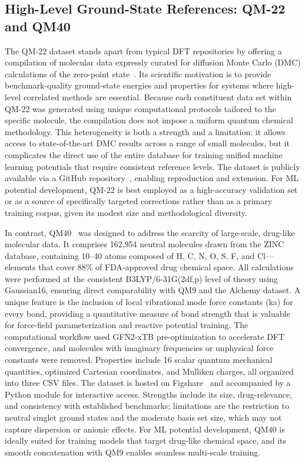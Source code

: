 \documentclass[12pt]{article}
\begin{document}
\subsection{High-Level Ground-State References: QM-22 and QM40}

The QM-22 dataset stands apart from typical DFT repositories by offering a compilation of molecular data expressly curated for diffusion Monte Carlo (DMC) calculations of the zero-point state~\cite{ds41-40}. Its scientific motivation is to provide benchmark-quality ground-state energies and properties for systems where high-level correlated methods are essential. Because each constituent data set within QM-22 was generated using unique computational protocols tailored to the specific molecule, the compilation does not impose a uniform quantum chemical methodology. This heterogeneity is both a strength and a limitation: it allows access to state-of-the-art DMC results across a range of small molecules, but it complicates the direct use of the entire database for training unified machine learning potentials that require consistent reference levels. The dataset is publicly available via a GitHub repository~\cite{ds41-188}, enabling reproduction and extension. For ML potential development, QM-22 is best employed as a high-accuracy validation set or as a source of specifically targeted corrections rather than as a primary training corpus, given its modest size and methodological diversity.

In contrast, QM40~\cite{ds48-1} was designed to address the scarcity of large-scale, drug-like molecular data. It comprises 162,954 neutral molecules drawn from the ZINC database, containing 10–40 atoms composed of H, C, N, O, S, F, and Cl—elements that cover 88\% of FDA-approved drug chemical space. All calculations were performed at the consistent B3LYP/6-31G(2df,p) level of theory using Gaussian16, ensuring direct comparability with QM9 and the Alchemy dataset. A unique feature is the inclusion of local vibrational mode force constants (ka) for every bond, providing a quantitative measure of bond strength that is valuable for force-field parameterization and reactive potential training. The computational workflow used GFN2-xTB pre-optimization to accelerate DFT convergence, and molecules with imaginary frequencies or unphysical force constants were removed. Properties include 16 scalar quantum mechanical quantities, optimized Cartesian coordinates, and Mulliken charges, all organized into three CSV files. The dataset is hosted on Figshare~\cite{ds48-2} and accompanied by a Python module for interactive access. Strengths include its size, drug-relevance, and consistency with established benchmarks; limitations are the restriction to neutral singlet ground states and the moderate basis set size, which may not capture dispersion or anionic effects. For ML potential development, QM40 is ideally suited for training models that target drug-like chemical space, and its smooth concatenation with QM9 enables seamless multi-scale training.
\end{document}
